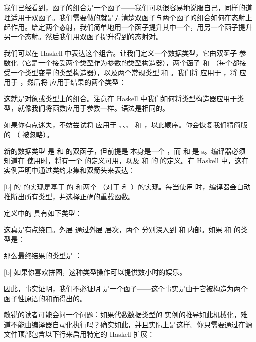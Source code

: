 我们已经看到，函子的组合是一个函子——我们可以很容易地说服自己，同样的道理适用于双函子。我们需要做的就是弄清楚双函子与两个函子的组合如何在态射上起作用。给定两个态射，我们简单地用一个函子提升其中一个，用另一个函子提升另一个态射。然后我们用双函子提升得到的态射对。

我们可以在 Haskell 中表达这个组合。让我们定义一个数据类型，它由双函子  参数化（它是一个接受两个类型作为参数的类型构造器），两个函子  和 （每个都接受一个类型变量的类型构造器），以及两个常规类型  和 。我们将  应用于 ，将  应用于 ，然后将  应用于结果的两个类型：

这就是对象或类型上的组合。注意在 Haskell 中我们如何将类型构造器应用于类型，就像我们将函数应用于参数一样。语法是相同的。

如果你有点迷失，不妨尝试将  应用于 、、、 和 ，以此顺序。你会恢复我们精简版的 （ 被忽略）。

新的数据类型  是  和  的双函子，但前提是  本身是一个 ，而  和  是 s。编译器必须知道在  使用时，将有一个  的定义可用，以及  和  的  的定义。在 Haskell 中，这在实例声明中通过类约束集和双箭头来表达：

[b]
 的  的实现是基于  的  和两个 （对于  和 ）的实现。每当使用  时，编译器会自动推断出所有类型，并选择正确的重载函数。

 定义中的  具有如下类型：

这真是有点绕口。外层  通过外层  层次，两个  分别深入到  和  内部。如果  和  的类型是：

那么最终结果的类型是 ：

[b]
如果你喜欢拼图，这种类型操作可以提供数小时的娱乐。

因此，事实证明，我们不必证明  是一个函子——这个事实是由于它被构造为两个函子性原语的和而得出的。

敏锐的读者可能会问一个问题：如果代数数据类型的  实例的推导如此机械化，难道不能由编译器自动化执行吗？确实如此，并且实际上是这样。你只需要通过在源文件顶部包含以下行来启用特定的 Haskell 扩展：

